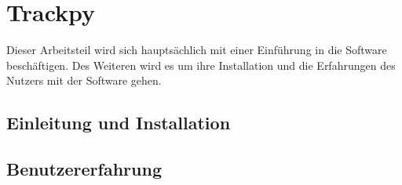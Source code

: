 \chapter{Trackpy}

Dieser Arbeitsteil  wird sich hauptsächlich mit einer Einführung in die Software beschäftigen. Des Weiteren wird es um ihre Installation und die Erfahrungen des Nutzers mit der Software gehen.

\section{Einleitung und Installation \label{Kap2.1_Einleitung_Installation}}


\section{Benutzererfahrung}

